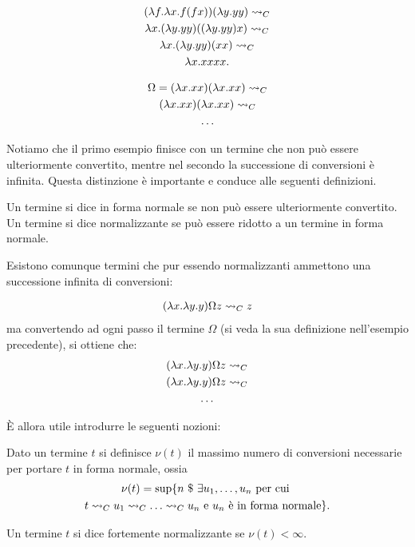 \documentclass[]{marticle}
\begin{document}
\begin{block}[Esempio]
    \begin{gather*}
        (\lambda f . \lambda x . f(fx))(\lambda y. yy) \rightsquigarrow_C  \\
        \lambda x. (\lambda y. yy)((\lambda y.yy) x) \rightsquigarrow_C \\
        \lambda x .(\lambda y. yy)(xx) \rightsquigarrow_C \\
        \lambda x. xxxx.
    \end{gather*}
\end{block}

\begin{block}[Esempio]
    \begin{gather*}
        \Omega = (\lambda x.xx)(\lambda x.xx) \rightsquigarrow_C \\ 
        (\lambda x.xx)(\lambda x.xx) \rightsquigarrow_C \\
        \dots
    \end{gather*}
\end{block}

Notiamo che il primo esempio finisce con un termine che non pu\`o essere
ulteriormente convertito, mentre nel secondo la successione di conversioni \`e
infinita. Questa distinzione \`e importante e conduce alle seguenti definizioni.

\begin{block}[Definizione]
    Un termine si dice in forma normale se non pu\`o essere ulteriormente
    convertito. Un termine si dice normalizzante se pu\`o essere ridotto a un
    termine in forma normale.
\end{block}

Esistono comunque termini che pur essendo normalizzanti ammettono una
successione infinita di conversioni:

\begin{block}[Esempio]
    \begin{gather*}
        (\lambda x . \lambda y. y)\Omega z \rightsquigarrow_C z
    \end{gather*}
    ma convertendo ad ogni passo il termine $\Omega$ (si veda la sua definizione
    nell'esempio precedente), si ottiene che:
    \begin{gather*}
        (\lambda x . \lambda y. y)\Omega z \rightsquigarrow_C \\ 
        (\lambda x . \lambda y. y)\Omega z \rightsquigarrow_C \\
        \dots
    \end{gather*}
\end{block}

\`E allora utile introdurre le seguenti nozioni:
\begin{block}[Definizione]
    Dato un termine $t$ si definisce $\nu(t)$ il massimo numero di conversioni
    necessarie per portare $t$ in forma normale, ossia
    \begin{gather*}
        \nu (t) = \sup \setof { n \st
            \exists u_1, \dots, u_n \text{ per cui } \\
            t \conv_C u_1 \conv_C \dots
            \conv_C u_n \text{ e $u_n$ \`e in forma normale}
        }.
    \end{gather*}

    Un termine $t$ si dice fortemente normalizzante se $\nu(t) < \infty$.
\end{block}
\end{document}
